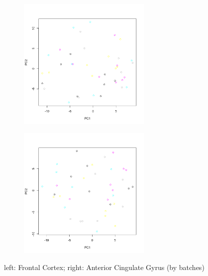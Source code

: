 \begin{figure}
\begin{subfigure}[t]{0.5\linewidth}
\centering
\includegraphics[width=0.7\textwidth]{./Figures/fig5/Fig5-FrontalCortex_batches.png}\par
\end{subfigure}%
\begin{subfigure}[t]{0.5\linewidth}
\centering
\includegraphics[width=0.7\textwidth]{./Figures/fig5/Fig5-Anterior-Cingulate-Gyrus_batches.png}\par
\end{subfigure}%
\caption{\label{fig5} left: Frontal Cortex; right: Anterior Cingulate Gyrus (by batches)}


\end{figure}
